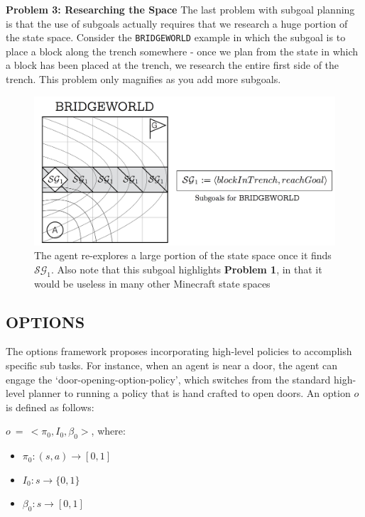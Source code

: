 \documentclass[]{article}
\begin{document}

{\bf Problem 3: Researching the Space} The last problem with subgoal planning is that the use of subgoals actually requires that we research a huge portion of the state space. Consider the \texttt{BRIDGEWORLD} example in which the subgoal is to place a block along the trench somewhere - once we plan from the state in which a block has been placed at the trench, we research the entire first side of the trench. This problem only magnifies as you add more subgoals.

\begin{figure}
\centering
\includegraphics[scale=0.22]{figures/bridgeworld_sg.png}
\caption{The agent re-explores a large portion of the state space once it finds $\mathcal{SG}_1$. Also note that this subgoal highlights {\bf Problem 1}, in that it would be useless in many other Minecraft state spaces}
\end{figure}

\subsection{OPTIONS}

The options framework proposes incorporating high-level policies to accomplish specific sub tasks. For instance, when an agent is near a door, the agent can engage the `door-opening-option-policy', which switches from the standard high-level planner to running a policy that is hand crafted to open doors. An option $o$ is defined as follows:

$o\ =\ <\pi_0, I_0, \beta_0>$, where:

\begin{itemize}
\item[] $\pi_0 : (s,a) \rightarrow [0,1]$
\item[] $I_0 : s \rightarrow \{0,1\}$
\item[] $\beta_0 : s \rightarrow [0,1]$
\end{itemize}
\end{document}
